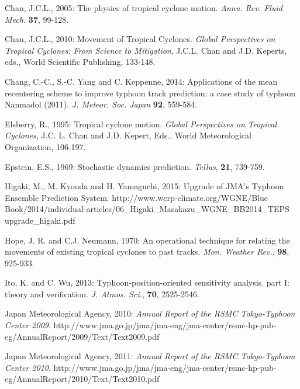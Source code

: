 \documentclass[a4paper, 12pt]{article}
\begin{document}
{\begin{list}{}{\leftmargin=1em \itemindent=-2em}
\item Chan, J.C.L., 2005: The physics of tropical cyclone motion. \emph{Annu. Rev. Fluid Mech.} {\bf 37}, 99-128.

\item Chan, J.C.L., 2010: Movement of Tropical Cyclones. \emph{Global Perspectives on Tropical Cyclones: From Science to Mitigation}, J.C.L. Chan and J.D. Keperts, eds., World Scientific Publishing, 133-148.


\item  Chang, C.-C., S.-C. Yang and C. Keppenne, 2014: Applications of the mean recentering scheme to improve typhoon track prediction:  a case study of typhoon Nanmadol (2011). \emph{J. Meteor. Soc. Japan} {\bf 92}, 559-584.



\item Elsberry, R., 1995: Tropical cyclone motion. \emph{Global Perspectives on Tropical Cyclones}, J.C. L. Chan and J.D. Kepert, Eds., World Meteorological Organization, 106-197.

\item Epstein, E.S., 1969: Stochastic dynamics prediction. \emph{Tellus}, {\bf 21}, 739-759.


\item Higaki, M., M. Kyouda and H. Yamaguchi, 2015: Upgrade of JMA's Typhoon Ensemble Prediction System. http://www.wcrp-climate.org/WGNE/Blue Book/2014/individual-articles/06\_Higaki\_Masakazu\_WGNE\_BB2014\_TEPS upgrade\_higaki.pdf


\item Hope, J. R. and C.J. Neumann, 1970: An operational technique for relating the movements of existing tropical cyclones to past tracks. \emph{Mon. Weather Rev.}, {\bf 98}, 925-933.


    \item Ito, K. and C. Wu, 2013: Typhoon-position-oriented sensitivity analysis. part I: theory and verification. \emph{J. Atmos. Sci.}, {\bf 70}, 2525-2546.

\item Japan Meteorological Agency, 2010: {\em Annual Report of the RSMC Tokyo-Typhoon Center 2009}. http://www.jma.go.jp/jma/jma-eng/jma-center/rsmc-hp-pub-eg/AnnualReport/2009/Text/Text2009.pdf

\item Japan Meteorological Agency, 2011: {\em Annual Report of the RSMC Tokyo-Typhoon Center 2010}. http://www.jma.go.jp/jma/jma-eng/jma-center/rsmc-hp-pub-eg/AnnualReport/2010/Text/Text2010.pdf


\end{list}}
\end{document}
